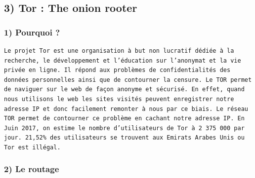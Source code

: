 \documentclass[]{article}
\begin{document}
\subsection{3) Tor : The onion rooter}\label{tor-the-onion-rooter}

\subsubsection{1) Pourquoi ?}\label{pourquoi}

\begin{verbatim}
Le projet Tor est une organisation à but non lucratif dédiée à la recherche, le développement et l’éducation sur l’anonymat et la vie privée en ligne. Il répond aux problèmes de confidentialités des données personnelles ainsi que de contourner la censure. Le TOR permet de naviguer sur le web de façon anonyme et sécurisé. En effet, quand nous utilisons le web les sites visités peuvent enregistrer notre adresse IP et donc facilement remonter à nous par ce biais. Le réseau TOR permet de contourner ce problème en cachant notre adresse IP. En Juin 2017, on estime le nombre d’utilisateurs de Tor à 2 375 000 par jour. 21,52% des utilisateurs se trouvent aux Emirats Arabes Unis ou Tor est illégal.
\end{verbatim}

\subsubsection{2) Le routage}\label{le-routage}
\end{document}
